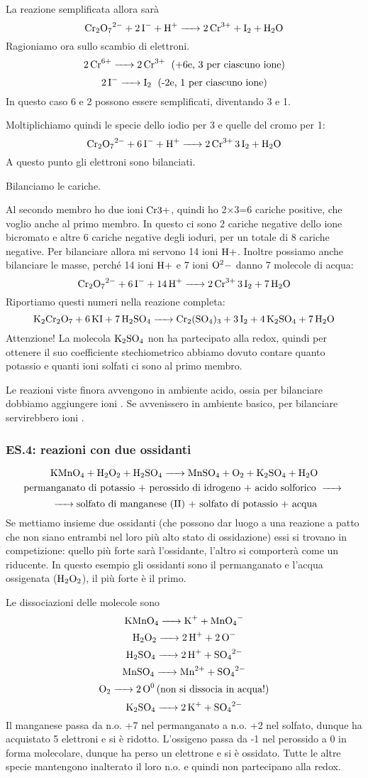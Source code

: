 La reazione semplificata allora sarà
$$\ce{Cr_2O_7^2- + 2I^- + H+ -> 2Cr^3+ + I_2 + H_2O}$$
Ragioniamo ora sullo scambio di elettroni.
$$\ce{2Cr^6+ -> 2Cr^3+ \; \text{(+6e, 3 per ciascuno ione)}}$$
$$\ce{2I- -> I_2 \; \text{(-2e, 1 per ciascuno ione)}}$$
In questo caso 6 e 2 possono essere semplificati, diventando 3 e 1.

Moltiplichiamo quindi le specie dello iodio per 3 e quelle del cromo per 1:
$$\ce{Cr_2O_7^2- + 6I^- + H+ -> 2Cr^3+ 3I_2 + H_2O}$$
A questo punto gli elettroni sono bilanciati.

Bilanciamo le cariche.

Al secondo membro ho due ioni $\rm Cr3+$, quindi ho 2$\times$3=6 cariche positive, che voglio anche al primo membro. In questo ci sono 2 cariche negative dello ione bicromato e altre 6 cariche negative degli ioduri, per un totale di 8 cariche negative. Per bilanciare allora mi servono 14 ioni $\rm H+$. Inoltre possiamo anche bilanciare le masse, perché 14 ioni $\rm H+$ e 7 ioni $\rm O^2-$ danno 7 molecole di acqua:
$$\ce{Cr_2O_7^2- + 6I^- + 14H+ -> 2Cr^3+ 3I_2 + 7H_2O}$$
Riportiamo questi numeri nella reazione completa:
$$\ce{K_2Cr_2O_7 + 6KI + 7H_2SO_4 -> Cr_2(SO_4)_3 + 3I_2 + 4K_2SO_4 + 7H_2O}$$
Attenzione! La molecola $\rm K_2SO_4$ non ha partecipato alla redox, quindi per ottenere il suo coefficiente stechiometrico abbiamo dovuto contare quanto potassio e quanti ioni solfati ci sono al primo membro.

\vspace{0.2cm}Le reazioni viste finora avvengono in ambiente acido, ossia per bilanciare dobbiamo aggiungere ioni . Se avvenissero in ambiente basico, per bilanciare servirebbero ioni .
\subsubsection{\textbf{ES.4: reazioni con due ossidanti}}
$$\ce{KMnO_4 + H_2O_2 + H_2SO_4 -> MnSO_4 + O_2 + K_2SO_4 + H_2O}$$
$$\text{permanganato di potassio + perossido di idrogeno + acido solforico }\ce{->}$$
$$\ce{->}\text{solfato di manganese (II) + solfato di potassio + acqua}$$
Se mettiamo insieme due ossidanti (che possono dar luogo a una reazione a patto che non siano entrambi nel loro più alto stato di ossidazione) essi si trovano in competizione: quello più forte sarà l'ossidante, l'altro si comporterà come un riducente. In questo esempio gli ossidanti sono il permanganato e l'acqua ossigenata ($\rm H_2O_2$), il più forte è il primo.

Le dissociazioni delle molecole sono
$$\ce{KMnO_4 -> K+ + MnO_4-}$$
$$\ce{H_2O_2 -> 2H+ + 2O-}$$
$$\ce{H_2SO_4 -> 2H+ + SO_4^2-}$$
$$\ce{MnSO_4 -> Mn^2+ + SO_4^2-}$$
$$\ce{O_2 -> 2O^0 \text{(non si dissocia in acqua!)}}$$
$$\ce{K_2SO_4 -> 2K+ + SO_4^2-}$$
Il manganese passa da n.o. +7 nel permanganato a n.o. +2 nel solfato, dunque ha acquistato 5 elettroni e si è ridotto. L'ossigeno passa da -1 nel perossido a 0 in forma molecolare, dunque ha perso un elettrone e si è ossidato. Tutte le altre specie mantengono inalterato il loro n.o. e quindi non partecipano alla redox.


